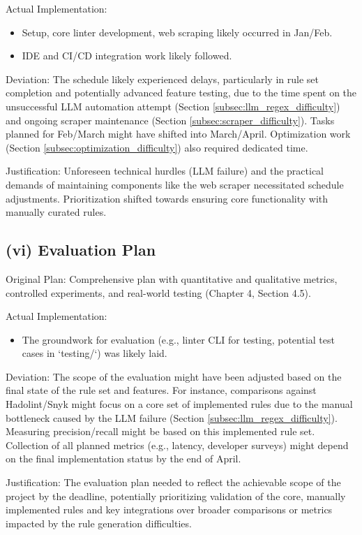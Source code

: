 Actual Implementation:
\begin{itemize}
    \item Setup, core linter development, web scraping likely occurred in Jan/Feb.
    \item IDE and CI/CD integration work likely followed.
\end{itemize}
Deviation: The schedule likely experienced delays, particularly in rule set completion and potentially advanced feature testing, due to the time spent on the unsuccessful LLM automation attempt (Section \ref{subsec:llm_regex_difficulty}) and ongoing scraper maintenance (Section \ref{subsec:scraper_difficulty}). Tasks planned for Feb/March might have shifted into March/April. Optimization work (Section \ref{subsec:optimization_difficulty}) also required dedicated time.

Justification: Unforeseen technical hurdles (LLM failure) and the practical demands of maintaining components like the web scraper necessitated schedule adjustments. Prioritization shifted towards ensuring core functionality with manually curated rules.

\subsection{(vi) Evaluation Plan}
Original Plan: Comprehensive plan with quantitative and qualitative metrics, controlled experiments, and real-world testing (Chapter 4, Section 4.5).

Actual Implementation:
\begin{itemize}
    \item The groundwork for evaluation (e.g., linter CLI for testing, potential test cases in `testing/`) was likely laid.
\end{itemize}
Deviation: The scope of the evaluation might have been adjusted based on the final state of the rule set and features. For instance, comparisons against Hadolint/Snyk might focus on a core set of implemented rules due to the manual bottleneck caused by the LLM failure (Section \ref{subsec:llm_regex_difficulty}). Measuring precision/recall might be based on this implemented rule set. Collection of all planned metrics (e.g., latency, developer surveys) might depend on the final implementation status by the end of April.

Justification: The evaluation plan needed to reflect the achievable scope of the project by the deadline, potentially prioritizing validation of the core, manually implemented rules and key integrations over broader comparisons or metrics impacted by the rule generation difficulties.

